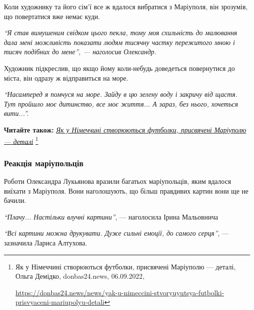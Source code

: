 Коли художнику та його сім'ї все ж вдалося вибратися з Маріуполя, він зрозумів,
що повертатися вже немає куди.

\begin{leftbar}
\emph{\enquote{Я став вимушеним свідком цього пекла, тому моя схильність до малювання дала
мені можливість показати людям тисячну частку пережитого мною і тисяч
подібних до мене}, — наголосив Олександр.}
\end{leftbar}


Художник підкреслив, що якщо йому коли-небудь доведеться повернутися до міста,
він одразу ж відправиться на море.

\begin{leftbar}
\emph{\enquote{Насамперед я помчуся на море. Зайду в цю зелену воду і закричу
від щастя. Тут пройшло моє дитинство, все моє життя... А зараз, без
нього, хочеться вити...}.}
\end{leftbar}


\textbf{Читайте також:} \href{https://donbas24.news/news/yak-u-nimeccini-stvoryuyutsya-futbolki-prisvyaceni-mariupolyu-detali}{\emph{Як у Німеччині створюються футболки, присвячені Маріуполю — деталі}}%
\footnote{Як у Німеччині створюються футболки, присвячені Маріуполю — деталі, Ольга Демідко, donbas24.news, 06.09.2022, \par%
\url{https://donbas24.news/news/yak-u-nimeccini-stvoryuyutsya-futbolki-prisvyaceni-mariupolyu-detali}%
}

\subsubsection{Реакція маріупольців}

Роботи Олександра Лукьянова вразили багатьох маріупольців, яким вдалося виїхати
з Маріуполя. Вони наголошують, що більш правдивих картин вони ще не бачили.

\begin{leftbar}
\emph{\enquote{Плачу... Настільки влучні картини}}, — наголосила Ірина Мальовнича
\end{leftbar}

\begin{leftbar}
\emph{\enquote{Всі картини можна друкувати. Дуже сильні емоції, до самого серця}}, — зазначила Лариса Алтухова.
\end{leftbar}

